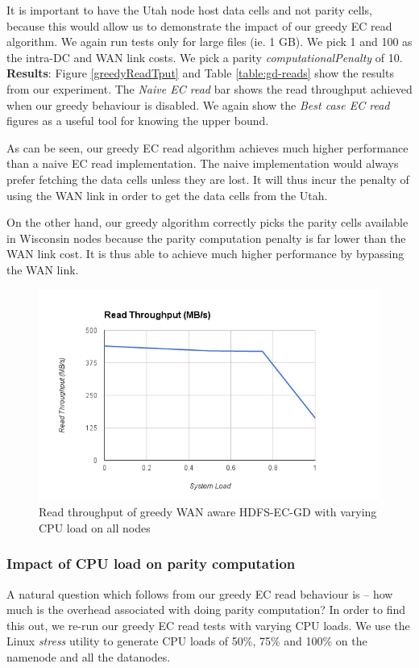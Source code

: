 \documentclass{sig-alternate-05-2015}
\begin{document}
It is important to have the Utah node host data cells and not parity cells, because this would allow us to demonstrate the impact of our greedy EC read algorithm. We again run tests only for large files (ie. 1 GB). We pick 1 and 100 as the intra-DC and WAN link costs. We pick a parity \emph{computationalPenalty} of 10. \\

\textbf{Results}: Figure \ref{greedyReadTput} and Table \ref{table:gd-reads} show the results from our experiment. The \emph{Naive EC read} bar shows the read throughput achieved when our greedy behaviour is disabled. We again show the \emph{Best case EC read} figures as a useful tool for knowing the upper bound. 

As can be seen, our greedy EC read algorithm achieves much higher performance than a naive EC read implementation. The naive implementation would always prefer fetching the data cells unless they are lost. It will thus incur the penalty of using the WAN link in order to get the data cells from the Utah. 

On the other hand, our greedy algorithm correctly picks the parity cells available in Wisconsin nodes because the parity computation penalty is far lower than the WAN link cost. It is thus able to achieve much higher performance by bypassing the WAN link. 

\begin{figure}
\centering
\includegraphics[scale=0.4]{stress.png}
\caption{Read throughput of greedy WAN aware HDFS-EC-GD with varying CPU load on all nodes}
\label{greedy-stress}
\end{figure}

\subsubsection{Impact of CPU load on parity computation}
A natural question which follows from our greedy EC read behaviour is -- how much is the overhead associated with doing parity computation? In order to find this out, we re-run our greedy EC read tests with varying CPU loads. We use the Linux \emph{stress} \cite{linux-stress} utility to generate CPU loads of 50\%, 75\% and 100\% on the namenode and all the datanodes. 
\end{document}
